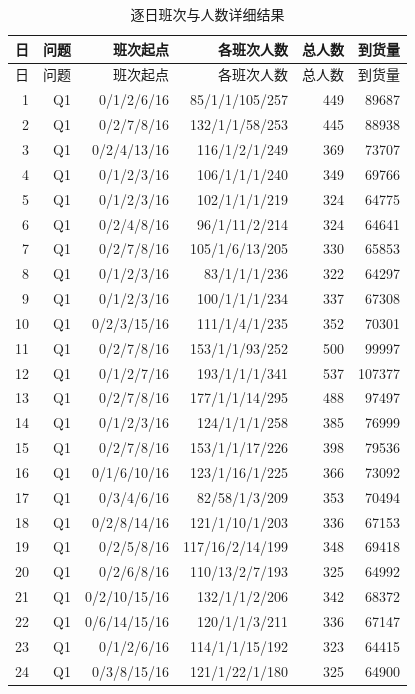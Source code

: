 \begin{longtable}{rrrrrr}
\caption{逐日班次与人数详细结果}\label{tab:daily-detail}\\
\toprule 日 & 问题 & 班次起点 & 各班次人数 & 总人数 & 到货量\\\midrule
\endfirsthead\toprule 日 & 问题 & 班次起点 & 各班次人数 & 总人数 & 到货量\\\midrule\endhead
1 & Q1 & 0/1/2/6/16 & 85/1/1/105/257 & 449 & 89687\\
2 & Q1 & 0/2/7/8/16 & 132/1/1/58/253 & 445 & 88938\\
3 & Q1 & 0/2/4/13/16 & 116/1/2/1/249 & 369 & 73707\\
4 & Q1 & 0/1/2/3/16 & 106/1/1/1/240 & 349 & 69766\\
5 & Q1 & 0/1/2/3/16 & 102/1/1/1/219 & 324 & 64775\\
6 & Q1 & 0/2/4/8/16 & 96/1/11/2/214 & 324 & 64641\\
7 & Q1 & 0/2/7/8/16 & 105/1/6/13/205 & 330 & 65853\\
8 & Q1 & 0/1/2/3/16 & 83/1/1/1/236 & 322 & 64297\\
9 & Q1 & 0/1/2/3/16 & 100/1/1/1/234 & 337 & 67308\\
10 & Q1 & 0/2/3/15/16 & 111/1/4/1/235 & 352 & 70301\\
11 & Q1 & 0/2/7/8/16 & 153/1/1/93/252 & 500 & 99997\\
12 & Q1 & 0/1/2/7/16 & 193/1/1/1/341 & 537 & 107377\\
13 & Q1 & 0/2/7/8/16 & 177/1/1/14/295 & 488 & 97497\\
14 & Q1 & 0/1/2/3/16 & 124/1/1/1/258 & 385 & 76999\\
15 & Q1 & 0/2/7/8/16 & 153/1/1/17/226 & 398 & 79536\\
16 & Q1 & 0/1/6/10/16 & 123/1/16/1/225 & 366 & 73092\\
17 & Q1 & 0/3/4/6/16 & 82/58/1/3/209 & 353 & 70494\\
18 & Q1 & 0/2/8/14/16 & 121/1/10/1/203 & 336 & 67153\\
19 & Q1 & 0/2/5/8/16 & 117/16/2/14/199 & 348 & 69418\\
20 & Q1 & 0/2/6/8/16 & 110/13/2/7/193 & 325 & 64992\\
21 & Q1 & 0/2/10/15/16 & 132/1/1/2/206 & 342 & 68372\\
22 & Q1 & 0/6/14/15/16 & 120/1/1/3/211 & 336 & 67147\\
23 & Q1 & 0/1/2/6/16 & 114/1/1/15/192 & 323 & 64415\\
24 & Q1 & 0/3/8/15/16 & 121/1/22/1/180 & 325 & 64900\\

\end{longtable}
